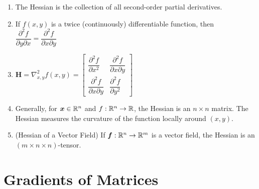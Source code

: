 \begin{enumerate}
    \item
    \begin{definition}[Hessian ($\bm{H} = \nabla^2_{x,y}f(x,y)$)]
        The Hessian is the collection of all second-order partial derivatives.
        \hfill \cite{mfml/book/mml/Deisenroth-Faisal-Ong}
    \end{definition}

    \item If $f (x, y)$ is a twice (continuously) differentiable function, then
    $
        \dfrac{\partial^2 f}{\partial y \partial x}
        = \dfrac{\partial^2 f}{\partial x \partial y}
    $
    \hfill \cite{mfml/book/mml/Deisenroth-Faisal-Ong}

    \item
    $
        \bm{H}
        = \nabla^2_{x,y}f(x,y)
        = \begin{bmatrix}
            \dfrac{\partial^2 f}{\partial x^2} & \dfrac{\partial^2 f}{\partial x \partial y} \\
            \dfrac{\partial^2 f}{\partial x \partial y} & \dfrac{\partial^2 f}{\partial y^2}
        \end{bmatrix}
    $
    \hfill \cite{mfml/book/mml/Deisenroth-Faisal-Ong}

    \item Generally, for $\bm{x} \in \mathbb{R}^n$ and $f : \mathbb{R}^n \to \mathbb{R}$, the Hessian is an $n \times n$ matrix.
    The Hessian measures the curvature of the function locally around $(x, y)$.
    \hfill \cite{mfml/book/mml/Deisenroth-Faisal-Ong}

    \item (Hessian of a Vector Field) If $\bm{f} : \mathbb{R}^n \to \mathbb{R}^m$ is a vector field, the Hessian is an $(m \times n \times n)$-tensor.
    \hfill \cite{mfml/book/mml/Deisenroth-Faisal-Ong}
\end{enumerate}














\section{Gradients of Matrices}



